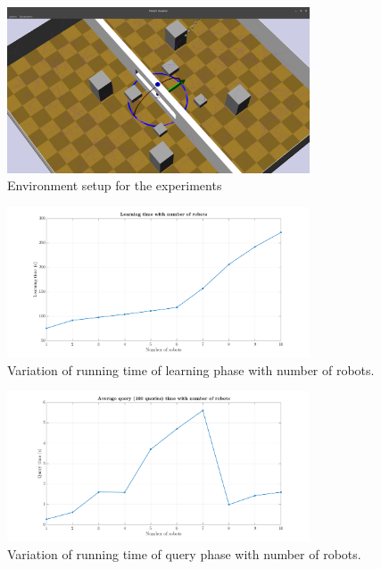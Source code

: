 \documentclass[12pt,a4paper, onecolumn]{IEEEtran}
\begin{document}
\begin{figure}[htbp]
  \centering
  \includegraphics[width=0.8\textwidth]{env.png}
  \caption{Environment setup for the experiments}
  \label{fig:env}
\end{figure}
\begin{figure}[htbp]
  \centering
  \includegraphics[width=0.8\textwidth, trim={4cm 0 4cm 0},clip]{lT_plot.png}
  \caption{Variation of running time of learning phase with number of robots. }
  \label{fig:lT}
\end{figure}

\begin{figure}[htbp]
  \centering
  \includegraphics[width=0.8\textwidth, trim={4cm 0 4cm 0},clip]{qT_plot.png}
  \caption{Variation of running time of query phase with number of robots. }
  \label{fig:qT}
\end{figure}
\end{document}
